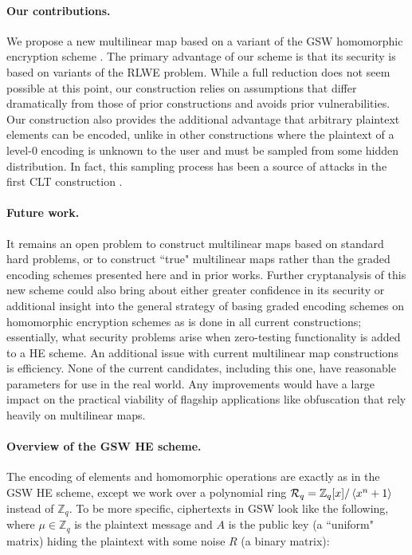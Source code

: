 \paragraph{Our contributions.}  We propose a new multilinear map based on a variant of the GSW homomorphic encryption scheme \cite{gsw}.  The primary advantage of our scheme is that its security is based on variants of the RLWE problem.  While a full reduction does not seem possible at this point, our construction relies on assumptions that differ dramatically from those of prior constructions and avoids prior vulnerabilities.  Our construction also provides the additional advantage that arbitrary plaintext elements can be encoded, unlike in other constructions where the plaintext of a level-0 encoding is unknown to the user and must be sampled from some hidden distribution.  In fact, this sampling process has been a source of attacks in the first CLT construction \cite{chl, cgh}.   

\paragraph{Future work.}  It remains an open problem to construct multilinear maps based on standard hard problems, or to construct ``true" multilinear maps rather than the graded encoding schemes presented here and in prior works.  Further cryptanalysis of this new scheme could also bring about either greater confidence in its security or additional insight into the general strategy of basing graded encoding schemes on homomorphic encryption schemes as is done in all current constructions; essentially, what security problems arise when zero-testing functionality is added to a HE scheme.  An additional issue with current multilinear map constructions is efficiency.  None of the current candidates, including this one, have reasonable parameters for use in the real world.  Any improvements would have a large impact on the practical viability of flagship applications like obfuscation that rely heavily on multilinear maps.

\paragraph{Overview of the GSW HE scheme.}  The encoding of elements and homomorphic operations are exactly as in the GSW HE scheme, except we work over a polynomial ring $\mathcal{R}_q = \mathbb{Z}_q[x] / \left<x^n + 1\right>$ instead of $\mathbb{Z}_q$.  To be more specific, ciphertexts in GSW look like the following, where $\mu \in \mathbb{Z}_q$ is the plaintext message and $A$ is the public key (a ``uniform" matrix) hiding the plaintext with some noise $R$ (a binary matrix):

